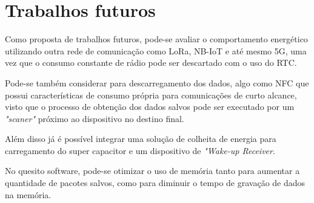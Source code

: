 \section{Trabalhos futuros}
Como proposta de trabalhos futuros, pode-se avaliar o comportamento energético utilizando outra rede de comunicação como LoRa, NB-IoT e até mesmo 5G, uma vez que o consumo constante de rádio pode ser descartado com o uso do RTC.

Pode-se também considerar para descarregamento dos dados, algo como NFC que possui características de consumo própria para comunicações de curto alcance, visto que o processo de obtenção dos dados salvos pode ser executado por um \textit{"scaner"} próximo ao dispositivo no destino final.

Além disso já é possível integrar uma solução de colheita de energia para carregamento do super capacitor e um dispositivo de \textit{"Wake-up Receiver}.

No quesito software, pode-se otimizar o uso de memória tanto para aumentar a quantidade de pacotes salvos, como para diminuir o tempo de gravação de dados na memória.



